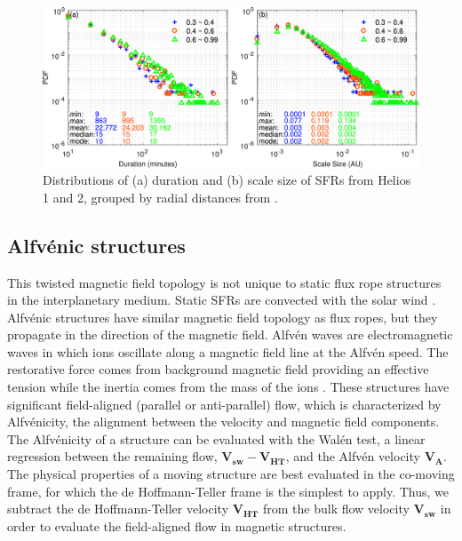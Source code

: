 \begin{figure}
    \centering
    \includegraphics[width=\textwidth]{Figures/helios_Chen21.jpg}
    \caption[Distributions of scale-size of SFRs from Helios 1 and 2 \citep{ChenHu:2020}]{Distributions of (a) duration and (b) scale size of SFRs from Helios 1 and 2, grouped by radial distances from \cite{ChenHu:2020}.}
    \label{fig:SFR-sizes}
\end{figure}

\subsection{Alfv\'enic structures}
This twisted magnetic field topology is not unique to static flux rope structures in the interplanetary medium. Static SFRs are convected with the solar wind \citep{Cartwright:2008}. Alfv\'enic structures have similar magnetic field topology as flux ropes, but they propagate in the direction of the magnetic field. Alfv\'en waves are electromagnetic waves in which ions oscillate along a magnetic field line at the Alfv\'en speed. The restorative force comes from background magnetic field providing an effective tension while the inertia comes from the mass of the ions \citep{Alfven:1942}. These structures have significant field-aligned (parallel or anti-parallel) flow, which is characterized by Alfv\'enicity, the alignment between the velocity and magnetic field components. The Alfv\'enicity of a structure can be evaluated with the Wal\'en test, a linear regression between the remaining flow, $\mathbf{V_{sw}} - \mathbf{V_{HT}}$, and the Alfv\'en velocity $\mathbf{V_A}$. The physical properties of a moving structure are best evaluated in the co-moving frame, for which the de Hoffmann-Teller frame \citep{deHoffman-Teller:1950} is the simplest to apply. Thus, we subtract the de Hoffmann-Teller velocity $\mathbf{V_{HT}}$ from the bulk flow velocity $\mathbf{V_{sw}}$ in order to evaluate the field-aligned flow in magnetic structures.

